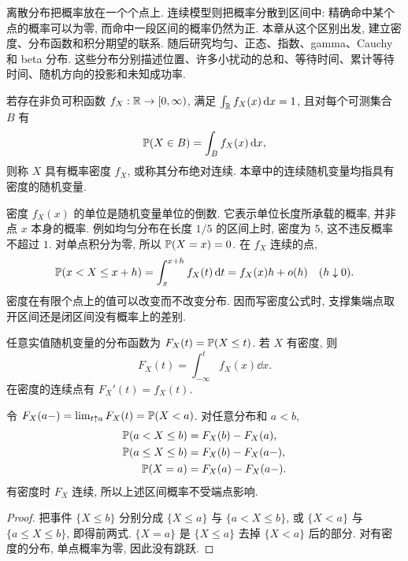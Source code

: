 \label{chap:continuous}

离散分布把概率放在一个个点上. 连续模型则把概率分散到区间中: 精确命中某个点的概率可以为零, 而命中一段区间的概率仍然为正. 本章从这个区别出发, 建立密度、分布函数和积分期望的联系. 随后研究均匀、正态、指数、gamma、Cauchy 和 beta 分布. 这些分布分别描述位置、许多小扰动的总和、等待时间、累计等待时间、随机方向的投影和未知成功率.


\begin{definition}[概率密度]
若存在非负可积函数 $f_X:\mathbb R\to[0,\infty)$, 满足 $\int_{\mathbb R}f_X(x)\,\mathrm d x=1$, 且对每个可测集合 $B$ 有
\[
 \mathbb P(X\in B)=\int_B f_X(x)\,\mathrm d x,
\]
则称 $X$ 具有概率密度 $f_X$, 或称其分布绝对连续. 本章中的连续随机变量均指具有密度的随机变量.
\end{definition}

密度 $f_X(x)$ 的单位是随机变量单位的倒数. 它表示单位长度所承载的概率, 并非点 $x$ 本身的概率. 例如均匀分布在长度 $1/5$ 的区间上时, 密度为 $5$, 这不违反概率不超过 $1$. 对单点积分为零, 所以 $\mathbb P(X=x)=0$. 在 $f_X$ 连续的点,
\[
 \mathbb P(x<X\le x+h)=\int_x^{x+h}f_X(t)\,\mathrm d t
 =f_X(x)h+o(h)\quad(h\downarrow0).
\]
密度在有限个点上的值可以改变而不改变分布. 因而写密度公式时, 支撑集端点取开区间还是闭区间没有概率上的差别.

\begin{definition}[分布函数]
任意实值随机变量的分布函数为 $F_X(t)=\mathbb P(X\le t)$. 若 $X$ 有密度, 则
\[
 F_X(t)=\int_{-\infty}^t f_X(x)\dd x.
\]
在密度的连续点有 $F_X'(t)=f_X(t)$.
\end{definition}

\begin{proposition}[区间端点]
令 $F_X(a-)=\lim_{t\uparrow a}F_X(t)=\mathbb P(X<a)$. 对任意分布和 $a<b$,
\begin{align*}
 \mathbb P(a<X\le b)&=F_X(b)-F_X(a),\\
 \mathbb P(a\le X\le b)&=F_X(b)-F_X(a-),\\
 \mathbb P(X=a)&=F_X(a)-F_X(a-).
\end{align*}
有密度时 $F_X$ 连续, 所以上述区间概率不受端点影响.
\end{proposition}
\begin{proof}
把事件 $\{X\le b\}$ 分别分成 $\{X\le a\}$ 与 $\{a<X\le b\}$, 或 $\{X<a\}$ 与 $\{a\le X\le b\}$, 即得前两式. $\{X=a\}$ 是 $\{X\le a\}$ 去掉 $\{X<a\}$ 后的部分. 对有密度的分布, 单点概率为零, 因此没有跳跃.
\end{proof}

